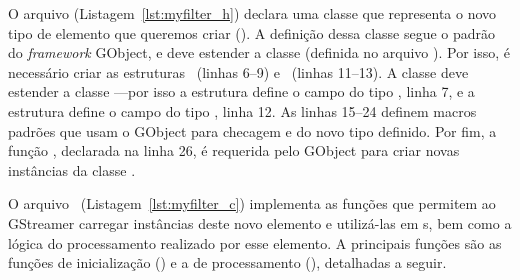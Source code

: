 O arquivo  (Listagem~\ref{lst:myfilter_h}) declara uma classe que
representa o novo tipo de elemento que queremos criar ().  A
definição dessa classe segue o padrão do \emph{framework} GObject, e deve
estender a classe  (definida no arquivo ).  Por
isso, é necessário criar as estruturas ~(linhas 6--9) e
~(linhas 11--13).  A classe  deve estender
a classe ---por isso a estrutura  define o campo
 do tipo , linha 7, e a estrutura
 define o campo  do tipo
, linha 12.  As linhas 15--24 definem macros padrões que
usam o  GObject para checagem e  do novo tipo
definido.  Por fim, a função , declarada na linha 26,
é requerida pelo  GObject para criar novas instâncias da 
classe .



O arquivo ~(Listagem~\ref{lst:myfilter_c}) implementa as funções
que permitem ao GStreamer carregar instâncias deste novo elemento e utilizá-las
em s, bem como a lógica do processamento realizado por esse
elemento.  A principais funções são as funções de inicialização () e
a de processamento (), detalhadas a seguir.




